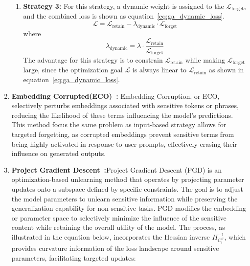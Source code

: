 \documentclass[11pt]{article}
\begin{document}
\begin{enumerate}
\begin{enumerate}
            \item{\textbf{Strategy 3:}}
            For this strategy, a dynamic weight is assigned to the $\mathcal{L}_\text{forget}$, and the combined loss is shown as equation~\ref{eq:ga_dynamic_loss}.
            \begin{equation}
                \mathcal{L} = \mathcal{L}_{\text{retain}} - \lambda_\text{dynamic}\cdot\mathcal{L}_{\text{forget}}
                \label{eq:ga_dynamic_loss}
            \end{equation}
            where
            \begin{equation}
                \lambda_\text{dynamic} = \lambda\cdot\frac{\mathcal{L}_\text{retain}}{\mathcal{L}_\text{forget}}
            \end{equation}
            The advantage for this strategy is to constrain $\mathcal{L}_\text{retain}$ while making $\mathcal{L}_\text{forget}$ large, since the optimization goal $\mathcal{L}$ is always linear to $\mathcal{L}_\text{retain}$ as shown in equation~\ref{eq:ga_dynamic_loss}.

        \end{enumerate}


        \item \textbf{Embedding Corrupted(ECO)~\cite{liu2024largelanguagemodelunlearning}:} Embedding Corruption, or ECO, selectively perturbs embeddings associated with sensitive tokens or phrases, reducing the likelihood of these terms influencing the model’s predictions. This method focus the same problem as input-based strategy allows for targeted forgetting, as corrupted embeddings prevent sensitive terms from being highly activated in response to user prompts, effectively erasing their influence on generated outputs.
        \item \textbf{Project Gradient Descent~\cite{Wei2024ProvableUI}:}Project Gradient Descent (PGD) is an optimization-based unlearning method that operates by projecting parameter updates onto a subspace defined by specific constraints. The goal is to adjust the model parameters to unlearn sensitive information while preserving the generalization capability for non-sensitive tasks. PGD modifies the embedding or parameter space to selectively minimize the influence of the sensitive content while retaining the overall utility of the model. The process, as illustrated in the equation below, incorporates the Hessian inverse \( H_{C_i^S}^{-1} \), which provides curvature information of the loss landscape around sensitive parameters, facilitating targeted updates:


\end{enumerate}
\end{document}
